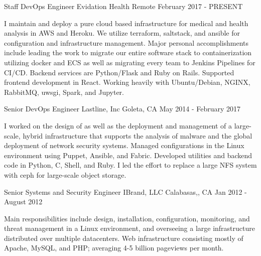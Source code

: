
\begin{cventries}
  \cventry
    {Staff DevOps Engineer} %
    {Evidation Health} %
    {Remote} %
    {February 2017 - PRESENT} %
    {
      \begin{cvitems} %
        {I maintain and deploy a pure cloud based infrastructure for medical and health analysis in
        AWS and Heroku. We utilize terraform, saltstack, and ansible for configuration and
        infrastructure management.
        Major personal accomplishments include leading the work to migrate our entire software stack
        to containerization utilizing docker and ECS as well as migrating every team to Jenkins
        Pipelines for CI/CD.
        Backend services are Python/Flask and Ruby on Rails. Supported frontend development in
        React.
        Working heavily with Ubuntu/Debian, NGINX, RabbitMQ, uwsgi, Spark, and Jupyter.}
      \end{cvitems}
    }

  \cventry
    {Senior DevOps Engineer} %
    {Lastline, Inc} %
    {Goleta, CA} %
    {May 2014 - February 2017} %
    {
      \begin{cvitems} %
        {I worked on the design of as well as the deployment and management of a large-scale, hybrid
        infrastructure that supports the analysis of malware and the global deployment of network
        security systems.
        Managed configurations in the Linux environment using Puppet, Ansible, and Fabric.
        Developed utilities and backend code in Python, C, Shell, and Ruby. I led the effort to replace a
        large NFS system with ceph for large-scale object storage.}
      \end{cvitems}
    }

  \cventry
    {Senior Systems and Security Engineer} %
    {IBrand, LLC} %
    {Calabasas,, CA} %
    {Jan 2012 - August 2012} %
    {
      \begin{cvitems} %
        {Main responsibilities include design, installation, configuration, monitoring, and threat
        management in a Linux environment, and overseeing a large infrastructure distributed over
        multiple datacenters. Web infrastructure consisting mostly of Apache, MySQL, and PHP;
        averaging 4-5 billion pageviews per month.}
      \end{cvitems}
    }


\end{cventries}
